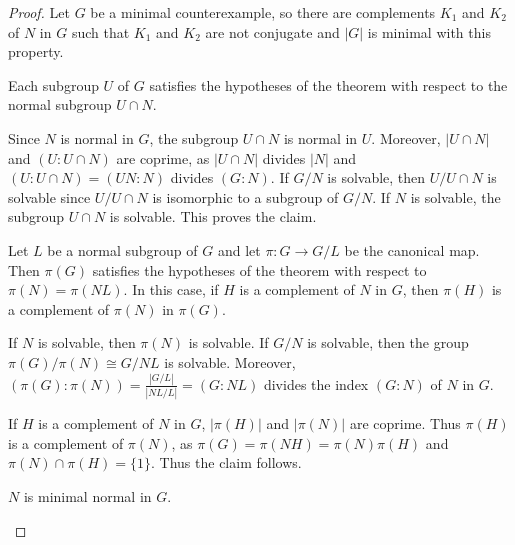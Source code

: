 \begin{proof}
	Let $G$ be a minimal counterexample, so there are complements $K_1$ and 
	$K_2$ of $N$ in $G$ such that $K_1$ and $K_2$ are not conjugate and $|G|$ is minimal with this
	property. 
	
	\begin{claim}
		Each subgroup $U$ of $G$ satisfies the hypotheses of the theorem with
		respect to the normal subgroup $U\cap N$.
	\end{claim}
	
	Since $N$ is normal in $G$, the subgroup $U\cap N$ is normal in $U$. Moreover, $|U\cap N|$ and 
	$(U:U\cap N)$ are coprime, as $|U\cap N|$ divides $|N|$ and $(U:U\cap
	N)=(UN:N)$ divides $(G:N)$. If $G/N$ is solvable, then $U/U\cap N$
	is solvable since $U/U\cap N$ is isomorphic to a subgroup of $G/N$. If $N$ is
	solvable, the subgroup $U\cap N$ is solvable. This proves the claim.
	

	\begin{claim}
		Let $L$ be a normal subgroup of $G$ and let $\pi\colon G\rightarrow G/L$ be the canonical map. Then 
		$\pi(G)$ satisfies the hypotheses of the theorem with respect to $\pi(N)=\pi(NL)$.
		In this case, if $H$ is a complement of $N$ in $G$, then $\pi(H)$ is a complement
		of $\pi(N)$ in $\pi(G)$.
	\end{claim}

	If $N$ is solvable, then $\pi(N)$ is solvable. If $G/N$ is solvable, then the group 
	$\pi(G)/\pi(N)\cong G/NL$ is solvable. Moreover, 
	$(\pi(G):\pi(N))=\frac{|G/L|}{|NL/ L|}=(G:NL)$ divides the index $(G:N)$ of $N$ in $G$. 
	
	If $H$ is a complement of $N$ in $G$, $|\pi(H)|$ and $|\pi(N)|$ are coprime.
	Thus $\pi(H)$ is a complement of $\pi(N)$, as 
	$\pi(G)=\pi(NH)=\pi(N)\pi(H)$ and 
	$\pi(N)\cap\pi(H)=\{1\}$. Thus the claim follows. 

	\begin{claim}
		$N$ is minimal normal in $G$.
	\end{claim}


\end{proof}
